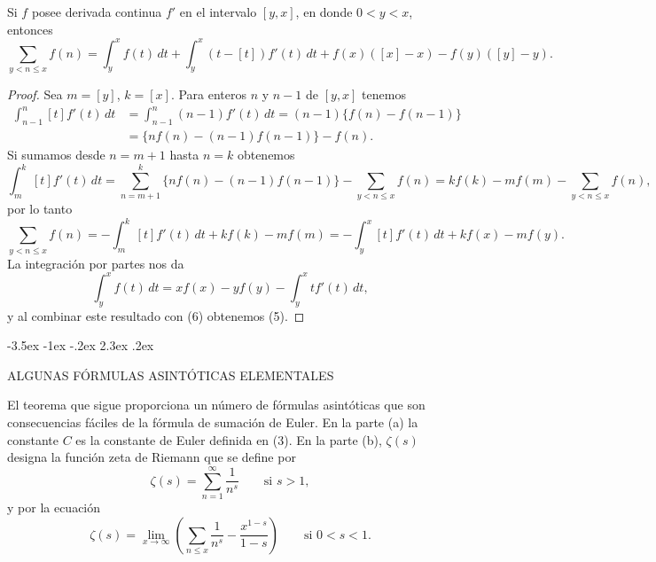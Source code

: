 \documentclass[12pt,a4paper]{book}
\makeatletter
\renewcommand\section{\@startsection{section}{1}{\z@}%
  {-3.5ex \@plus -1ex \@minus -.2ex}%
  {2.3ex \@plus .2ex}%
  {\normalfont\Large\bfseries\raggedright}}
\makeatother
\begin{document}
    \begin{teorema}
        Si $f$ posee derivada continua $f'$ en el intervalo $[y,x]$, en donde $0<y<x$,
        entonces
        \begin{equation}
            \sum_{y<n\leq x}f(n)=\int_{y}^{x} f(t)\,dt+\int_{y}^{x}(t-[t])f'(t)\,dt
            +f(x)([x]-x)-f(y)([y]-y).
        \end{equation}
    \end{teorema}

    \begin{proof}
        Sea $m=[y]$, $k=[x]$. Para enteros $n$ y $n-1$ de $[y,x]$ tenemos
        \begin{align*}
            \int_{n-1}^{n}[t]f'(t)\,dt&=\int_{n-1}^{n}(n-1)f'(t)\,dt=(n-1)\{f(n)-f(n-1)\}\\
            &=\{nf(n)-(n-1)f(n-1)\}-f(n).
        \end{align*}
        Si sumamos desde $n=m+1$ hasta $n=k$ obtenemos
        \begin{equation*}
            \int_{m}^{k}[t]f'(t)\,dt=\sum_{n=m+1}^{k}\{nf(n)-(n-1)f(n-1)\}-\sum_{y<n\leq x}f(n)
            =kf(k)-mf(m)-\sum_{y<n\leq x}f(n),
        \end{equation*}
        por lo tanto
        \begin{equation}
            \sum_{y<n\leq x}f(n)=-\int_{m}^{k}[t]f'(t)\,dt+kf(k)-mf(m)
            =-\int_{y}^{x}[t]f'(t)\,dt+kf(x)-mf(y).
        \end{equation}
        La integración por partes nos da
        \begin{equation*}
            \int_{y}^{x} f(t)\,dt=xf(x)-yf(y)-\int_{y}^{x} tf'(t)\,dt,
        \end{equation*}
        y al combinar este resultado con (6) obtenemos (5).
    \end{proof}

    \section{ALGUNAS FÓRMULAS ASINTÓTICAS ELEMENTALES}

    El teorema que sigue proporciona un número de fórmulas asintóticas que son
    consecuencias fáciles de la fórmula de sumación de Euler. En la parte (a) la constante
    $C$ es la constante de Euler definida en (3). En la parte (b), $\zeta(s)$ designa la
    función zeta de Riemann que se define por
    \begin{equation*}
        \zeta(s)=\sum_{n=1}^{\infty}\frac{1}{n^{s}}\qquad\text{si } s>1,
    \end{equation*}
    y por la ecuación
    \begin{equation*}
        \zeta(s)=\lim_{x\to\infty}\left(\sum_{n\leq x}\frac{1}{n^{s}}-\frac{x^{1-s}}{1-s}\right)
        \qquad\text{si } 0<s<1.
    \end{equation*}
\end{document}

